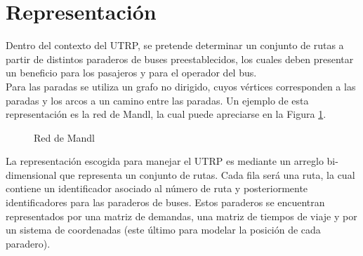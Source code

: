 \documentclass{llncs}
\begin{document}
\section{Representación}

Dentro del contexto del UTRP, se pretende determinar un conjunto de rutas a partir de distintos paraderos de buses preestablecidos, los cuales deben presentar un beneficio para los pasajeros y para el operador del bus.\\

Para las paradas se utiliza un grafo no dirigido, cuyos vértices corresponden a las paradas y los arcos a un camino entre las paradas. Un ejemplo de esta representación es la red de Mandl, la cual puede apreciarse en la Figura \ref{fig:mandl}.

\begin{figure}[!htb]
\begin{center}
\caption{Red de Mandl}
\label{fig:mandl}
\end{center}
\end{figure}

La representación escogida para manejar el UTRP es mediante un arreglo bi-dimensional que representa un conjunto de rutas. Cada fila será una ruta, la cual contiene un identificador asociado al número de ruta y posteriormente identificadores para las paraderos de buses. Estos paraderos se encuentran representados por una matriz de demandas, una matriz de tiempos de viaje y por un sistema de coordenadas (este último para modelar la posición de cada paradero).
\end{document}
